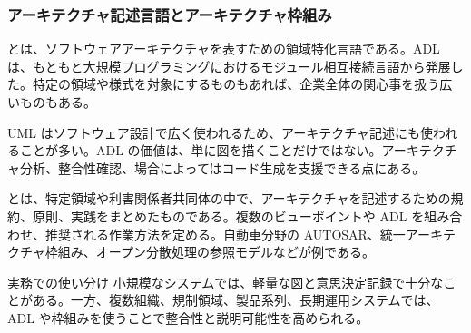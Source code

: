 \subsubsection{アーキテクチャ記述言語とアーキテクチャ枠組み}
とは、ソフトウェアアーキテクチャを表すための領域特化言語である。ADL は、もともと大規模プログラミングにおけるモジュール相互接続言語から発展した。特定の領域や様式を対象にするものもあれば、企業全体の関心事を扱う広いものもある。

UML はソフトウェア設計で広く使われるため、アーキテクチャ記述にも使われることが多い。ADL の価値は、単に図を描くことだけではない。アーキテクチャ分析、整合性確認、場合によってはコード生成を支援できる点にある。

とは、特定領域や利害関係者共同体の中で、アーキテクチャを記述するための規約、原則、実践をまとめたものである。複数のビューポイントや ADL を組み合わせ、推奨される作業方法を定める。自動車分野の AUTOSAR、統一アーキテクチャ枠組み、オープン分散処理の参照モデルなどが例である。

\begin{statementbox}{実務での使い分け}
小規模なシステムでは、軽量な図と意思決定記録で十分なことがある。一方、複数組織、規制領域、製品系列、長期運用システムでは、ADL や枠組みを使うことで整合性と説明可能性を高められる。
\end{statementbox}
